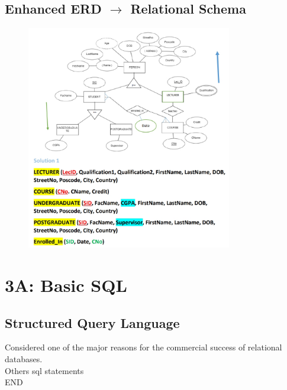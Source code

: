 \documentclass[a4paper, 12pt]{article}
\begin{document}
    \subsection{Enhanced ERD $\rightarrow$ Relational Schema}
    \begin{figure}[H]
        \includegraphics[width=0.8\textwidth]{chapter2c_14.png}
    \end{figure}

\newpage
\section{3A: Basic SQL}
    \subsection{Structured Query Language}
    Considered one of the major reasons for the commercial success
    of relational databases.\\
    Others sql statements\\
    END
    
\end{document}
